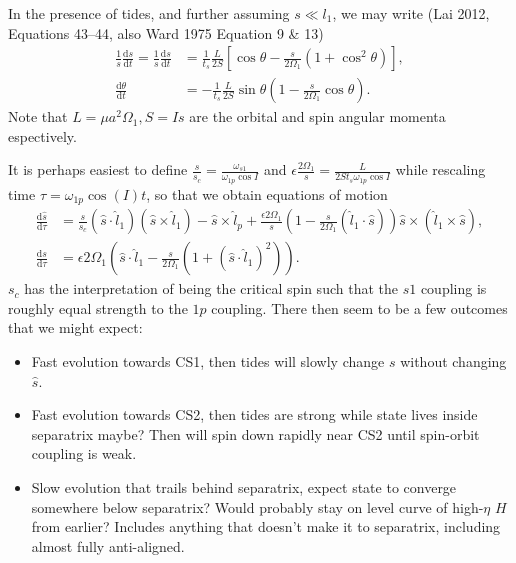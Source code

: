 \documentclass[11pt,
        usenames, %
        dvipsnames %
    ]{article}
\newcommand*{\rd}[2]{\frac{\mathrm{d}#1}{\mathrm{d}#2}}
\newcommand*{\p}[1]{\left(#1\right)}
\newcommand*{\s}[1]{\left[#1\right]}
\begin{document}
In the presence of tides, and further assuming $s \ll l_1$, we may write (Lai
2012, Equations 43--44, also Ward 1975 Equation 9 \& 13)
\begin{align}
    \frac{1}{s}\rd{s}{t}
        = \frac{1}{s}\rd{s}{t}
        &= \frac{1}{t_s}\frac{L}{2S}\s{\cos\theta
            - \frac{s}{2\Omega_1}\p{1 + \cos^2\theta}},\\
    \rd{\theta}{t} &= -\frac{1}{t_s}\frac{L}{2S}
        \sin\theta\p{1 - \frac{s}{2\Omega_1}\cos\theta}.
\end{align}
Note that $L = \mu a^2\Omega_1, S = Is$ are the orbital and spin angular momenta
espectively.

It is perhaps easiest to define $\frac{s}{s_c} =
\frac{\omega_{s1}}{\omega_{1p}\cos I}$ and $\epsilon\frac{2\Omega_1}{s} =
\frac{L}{2St_s \omega_{1p}\cos I}$ while rescaling time $\tau =
\omega_{1p}\cos(I) t$, so that we obtain equations of motion
\begin{align}
    \rd{\hat{s}}{\tau}
        &= \frac{s}{s_c}\p{\hat{s} \cdot \hat{l}_1}\p{\hat{s} \times \hat{l}_1}
            - \hat{s} \times \hat{l}_p
            + \frac{\epsilon 2\Omega_1}{s}
                \p{1 - \frac{s}{2\Omega_1}\p{\hat{l}_1 \cdot \hat{s}}}
                    \hat{s} \times \p{\hat{l}_1 \times \hat{s}},\\
    \rd{s}{\tau}
        &= \epsilon 2\Omega_1 \p{\hat{s} \cdot \hat{l}_1 - \frac{s}{2\Omega_1}\p{1
            + \p{\hat{s} \cdot \hat{l}_1}^2}}.
\end{align}
$s_c$ has the interpretation of being the critical spin such that the $s1$
coupling is roughly equal strength to the $1p$ coupling. There then seem to be a
few outcomes that we might expect:
\begin{itemize}
    \item Fast evolution towards CS1, then tides will slowly change $s$ without
        changing $\hat{s}$.

    \item Fast evolution towards CS2, then tides are strong while state lives
        inside separatrix maybe? Then will spin down rapidly near CS2 until
        spin-orbit coupling is weak.

    \item Slow evolution that trails behind separatrix, expect state to converge
        somewhere below separatrix? Would probably stay on level curve of
        high-$\eta$ $H$ from earlier? Includes anything that doesn't make it to
        separatrix, including almost fully anti-aligned.
\end{itemize}
\end{document}
